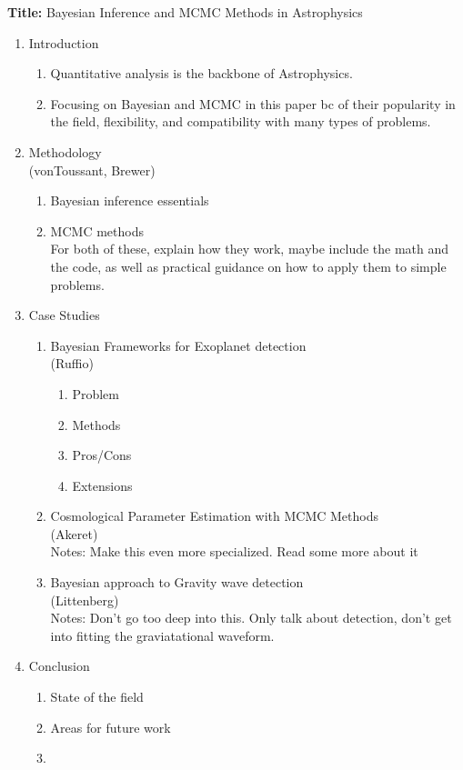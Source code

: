 \documentclass[12pt]{article}
\begin{document}
\textbf{Title:} Bayesian Inference and MCMC Methods in Astrophysics

\begin{enumerate}
  \item Introduction
  \begin{enumerate}
    \item Quantitative analysis is the backbone of Astrophysics.
    \item Focusing on Bayesian and MCMC in this paper bc of their popularity in the field, flexibility, and compatibility with many types of problems.
  \end{enumerate}
  \item Methodology \\ (vonToussant, Brewer)
  \begin{enumerate}
    \item Bayesian inference essentials
    \item MCMC methods \\ For both of these, explain how they work, maybe include the math and the code, as well as practical guidance on how to apply them to simple problems.
  \end{enumerate}
  \item Case Studies
  \begin{enumerate}
    \item Bayesian Frameworks for Exoplanet detection \\ (Ruffio)
    \begin{enumerate}
      \item Problem
      \item Methods
      \item Pros/Cons
      \item Extensions
    \end{enumerate}
    \item Cosmological Parameter Estimation with MCMC Methods \\ (Akeret) \\ Notes: Make this even more specialized. Read some more about it
    \item Bayesian approach to Gravity wave detection \\ (Littenberg) \\ Notes: Don't go too deep into this. Only talk about detection, don't get into fitting the graviatational waveform.
  \end{enumerate}
  \item Conclusion
  \begin{enumerate}
    \item State of the field
    \item Areas for future work
    \item 
  \end{enumerate}
\end{enumerate}
\end{document}
